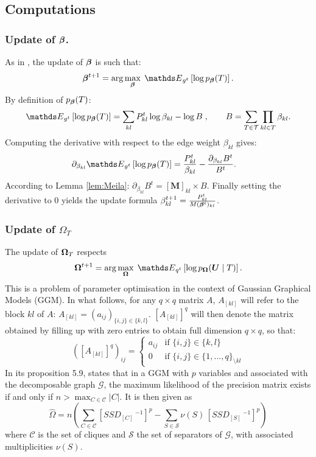 
\tocless\subsection{Computations} \label{app:comput}
\subsubsection[Update of tree parameter vector]{Update of ${\boldsymbol{\beta}}$.} \label{up:beta}
As in \citet{MRA20}, the update of ${\boldsymbol{\beta}}$ is such that:
$$\betabf^{t+1}  = \arg\max_\betabf \; \Esp_{g^t} \left[ \log p_\betabf(T) \right].
$$
By definition of $p_{\boldsymbol{\beta}}(T)$:
$$\Esp_{g^t} \left[ \log p_\betabf(T) \right] = \sum_{kl} P^t_{kl} \log \beta_{kl} - \log B\;,
\qquad
B=\sum_{T\in \mathcal{T}}\prod_{kl\in T} \beta_{kl}.$$
Computing the derivative with respect to the edge weight $\beta_{kl}$ gives:
\begin{align*}
\partial_{\beta_{kl}}\Esp_{g^t} \left[ \log p_\betabf(T) \right] &=\frac{P_{kl}^t}{\beta_{kl}} - \frac{\partial_{\beta_{kl}} B^t }{B^t}.
\end{align*}
According to Lemma \ref{lem:Meila}: $\partial_{\beta_{kl}} B^t  = [\boldsymbol{M}]_{kl} \times B$. Finally setting the derivative to 0 yields the update formula $
\beta^{t+1}_{kl} 
= \frac{P^t_{kl}}{ M({\boldsymbol{\beta}}^t)_{kl}}$.

\subsubsection[Update of Gaussian tree precision matrix]{Update of $\Omega_T$} \label{up:omega}
The update of ${\boldsymbol{\Omega}}_T$ respects
$$\Omegabf^{t+1}  = \arg\max_\Omegabf \; \Esp_{q^t} \left[ \log p_{\Omegabf}(\Ubf \mid T) \right].$$
This is a problem of parameter optimisation in the context of Gaussian Graphical Models (GGM).
In what follows, for any $q\times q$  matrix $A$, $A_{[kl]}$ will refer to the block $kl$ of $A$: $A_{[kl]}=(a_{ij})_{\{i,j\}\in\{k,l\}}$.   $[A_{[kl]}]^q$ will then denote the matrix obtained by filling up with zero entries to obtain full dimension $q\times q$, so that:
$$([A_{[kl]}]^q )_{ij}=\left\{ \begin{array}{rl}
a_{ij} & \text{if } \{i,j\}\in\{k,l\}\\
0 &  \text{if } \{i,j\}\in\{1,..., q\}_{\setminus kl}
\end{array}\right.$$
In its proposition 5.9, \citet{Lau96} states that in a  GGM with $p$ variables and associated with the decomposable graph $\mathcal{G}$, the maximum likelihood of the precision matrix exists if and only if $n > \max_{C\in \mathcal{C}} |C|$. It is then given as 
$$\widehat{\Omega}=n\left(\sum_{C\in \mathcal{C}} [SSD_{[C]}\,^{-1}]^p - \sum_{S\in \mathcal{S}} \nu(S)\,[SSD_{[S]}\,^{-1}]^p \right)$$
where $\mathcal{C}$ is the set of cliques and $\mathcal{S}$ the set of separators of $\mathcal{G}$, with associated multiplicities $\nu(S)$.\\


